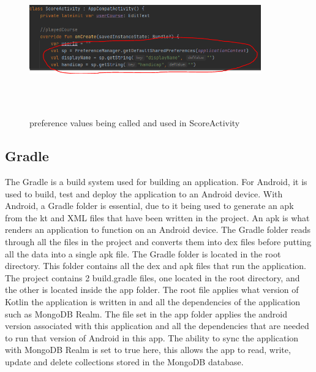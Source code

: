 \begin{figure}[H]
    \centering
    \includegraphics[width=10cm, height = 6.5cm]{img/prefs.PNG}
    \caption{preference values being called and used in ScoreActivity}
    \label{fig:preference values being called and used in ScoreActivity}
\end{figure}
\subsection{Gradle}
The Gradle is a build system used for building an application. For Android, it is used to build, test and deploy the application to an Android device.
\newline \newline
With Android, a Gradle folder is essential, due to it being used to \newline generate an apk from the kt and XML files that have been written in the project. An apk is what renders an application to function on an Android device. The Gradle folder reads through all the files in the project and \newline converts them into dex files before putting all the data into a single apk file.
\newline \newline
The Gradle folder is located in the root directory. This folder contains all the dex and apk files that run the application. The project contains 2 build.gradle files, one located in the root directory, and the other is located inside the app folder. The root file applies what version of Kotlin the application is written in and all the dependencies of the application such as MongoDB Realm. \newline \newline
The file set in the app folder applies the android version associated with this application and all the dependencies that are needed to run that version of Android in this app. The ability to sync the application with MongoDB Realm is set to true here, this allows the app to read, write, update and delete collections stored in the MongoDB database.

